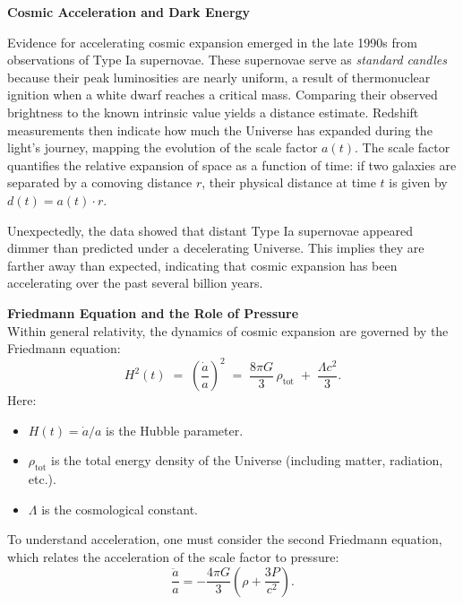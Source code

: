 \begin{technical}
{\Large\textbf{Cosmic Acceleration and Dark Energy}}

Evidence for accelerating cosmic expansion emerged in the late 1990s from observations of Type Ia supernovae. These supernovae serve as \emph{standard candles} because their peak luminosities are nearly uniform, a result of thermonuclear ignition when a white dwarf reaches a critical mass. Comparing their observed brightness to the known intrinsic value yields a distance estimate. Redshift measurements then indicate how much the Universe has expanded during the light’s journey, mapping the evolution of the scale factor \(a(t)\). The scale factor quantifies the relative expansion of space as a function of time: if two galaxies are separated by a comoving distance \(r\), their physical distance at time \(t\) is given by \(d(t) = a(t) \cdot r\).

Unexpectedly, the data showed that distant Type Ia supernovae appeared dimmer than predicted under a decelerating Universe. This implies they are farther away than expected, indicating that cosmic expansion has been accelerating over the past several billion years.

\medskip

\noindent\textbf{Friedmann Equation and the Role of Pressure}\\
Within general relativity, the dynamics of cosmic expansion are governed by the Friedmann equation:
\begin{equation}
  H^2(t) \;=\; \left(\frac{\dot{a}}{a}\right)^2 \;=\; \frac{8\pi G}{3}\,\rho_{\text{tot}} \;+\; \frac{\Lambda c^2}{3}.
\end{equation}
Here:
\begin{itemize}[leftmargin=*]
  \item \(H(t) = \dot{a}/a\) is the Hubble parameter.
  \item \(\rho_{\text{tot}}\) is the total energy density of the Universe (including matter, radiation, etc.).
  \item \(\Lambda\) is the cosmological constant.
\end{itemize}

To understand acceleration, one must consider the second Friedmann equation, which relates the acceleration of the scale factor to pressure:
\begin{equation}
\frac{\ddot{a}}{a} = -\frac{4\pi G}{3} \left( \rho + \frac{3P}{c^2} \right).
\end{equation}


\end{technical}
